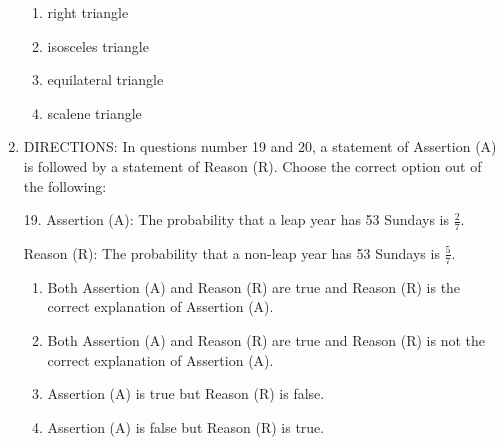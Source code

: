 \documentclass{article}
\begin{document}
\begin{enumerate}
\begin{enumerate}
    \item right triangle
    \item isosceles triangle
    \item equilateral triangle
    \item scalene triangle
\end{enumerate}
\item{DIRECTIONS:} In questions number 19 and 20, a statement of Assertion (A) is followed by a statement of Reason (R). Choose the correct option out of the following:

19. Assertion (A): The probability that a leap year has 53 Sundays is \(\frac{2}{7}\).

Reason (R): The probability that a non-leap year has 53 Sundays is \(\frac{5}{7}\).

\begin{enumerate}
    \item Both Assertion (A) and Reason (R) are true and Reason (R) is the correct explanation of Assertion (A).
    \item Both Assertion (A) and Reason (R) are true and Reason (R) is not the correct explanation of Assertion (A).
    \item Assertion (A) is true but Reason (R) is false.
    \item Assertion (A) is false but Reason (R) is true.
\end{enumerate}

\end{enumerate}
\end{document}
